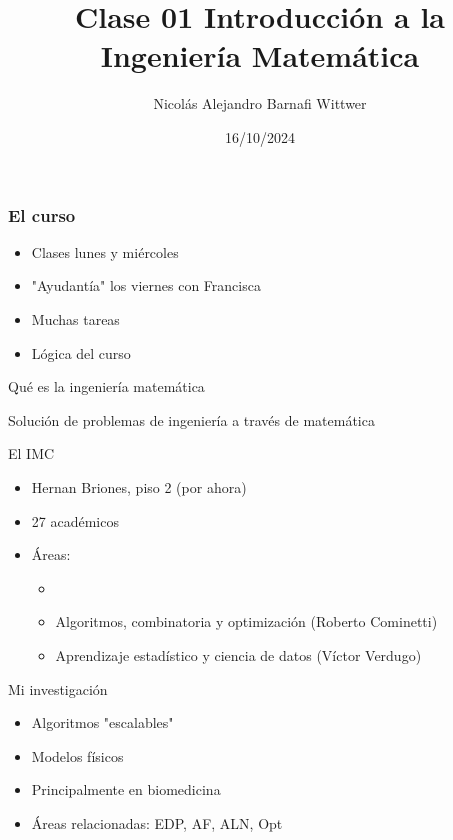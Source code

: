 \documentclass[14pt,aspectratio=169,xcolor=dvipsnames]{beamer}
\title[short title]{Clase 01 Introducción a la Ingeniería Matemática}
\subtitle{}
\author[NA Barnafi] {Nicolás Alejandro Barnafi Wittwer}
\institute[UC|CMM] 
{
    Pontificia Universidad Católica de Chile \\
    Centro de Modelamiento Matemático
}
\date{16/10/2024}
\begin{document}
\begin{frame}
    \maketitle
\end{frame}
\begin{frame}\frametitle{El curso}
    \begin{itemize}
        \item Clases lunes y miércoles
        \item "Ayudantía" los viernes con Francisca
        \item Muchas tareas
        \item Lógica del curso
    \end{itemize}
\end{frame}
\begin{frame}{Qué es la ingeniería matemática}
    \pause
    \begin{block}{}
        Solución de problemas de ingeniería a través de matemática
    \end{block}
\end{frame}
\begin{frame}{El IMC}
    \begin{itemize}
        \item Hernan Briones, piso 2 (por ahora)
        \item 27 académicos
        \item Áreas:
            \begin{itemize}
                \item {}
                \item Algoritmos, combinatoria y optimización (Roberto Cominetti)
                \item Aprendizaje estadístico y ciencia de datos (Víctor Verdugo)
            \end{itemize}
    \end{itemize}
\end{frame}
\begin{frame}{Mi investigación}
    \begin{itemize}
        \item Algoritmos "escalables"
        \item Modelos físicos
        \item Principalmente en biomedicina
        \item Áreas relacionadas: EDP, AF, ALN, Opt
    \end{itemize}
\end{frame}
\end{document}
